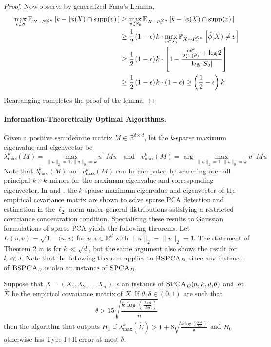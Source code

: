 \begin{proof}
Now observe by generalized Fano's Lemma,
\begin{align*}
\max_{v \in S} \mathbb{E}_{X \sim P_v^{\otimes n}} \left[ k - |\phi(X) \cap \textnormal{supp}(v)| \right] &\ge \max_{v \in S_0} \mathbb{E}_{X \sim P_v^{\otimes n}} \left[ k - |\phi(X) \cap \textnormal{supp}(v)| \right] \\
&\ge \frac{1}{2} \left( 1 - \epsilon \right)k \cdot \max_{v \in S_0} \mathbb{P}_{X \sim P_{v}^{\otimes n}} \left[ \hat{\phi}(X) \neq v \right] \\
&\ge \frac{1}{2} \left( 1 - \epsilon \right)k \cdot \left[ 1 - \frac{\frac{n\theta^2}{2(1 + \theta)} + \log 2}{\log |S_0|} \right] \\
&\ge \frac{1}{2} \left( 1 - \epsilon \right)k \cdot \left(1 - \epsilon \right) \ge \left( \frac{1}{2} - \epsilon \right) k
\end{align*}
Rearranging completes the proof of the lemma.
\end{proof}

\paragraph{Information-Theoretically Optimal Algorithms.} Given a positive semidefinite matrix $M \in \mathbb{R}^{d\times d}$, let the $k$-sparse maximum eigenvalue and eigenvector be
$$\lambda_{\max}^k(M) = \max_{\|u\|_2 = 1, \| u \|_0 = k} u^\top M u \quad \text{and} \quad v_{\max}^k(M) = \arg\max_{\| u \|_2  = 1, \| u \|_0 = k} u^\top M u$$
Note that $\lambda_{\max}^k(M)$ and $v_{\max}^k(M)$ can be computed by searching over all principal $k \times k$ minors for the maximum eigenvalue and corresponding eigenvector. In \cite{berthet2013complexity} and \cite{wang2016statistical}, the $k$-sparse maximum eigenvalue and eigenvector of the empirical covariance matrix are shown to solve sparse PCA detection and estimation in the $\ell_2$ norm under general distributions satisfying a restricted covariance concentration condition. Specializing these results to Gaussian formulations of sparse PCA yields the following theorems. Let $L(u, v) = \sqrt{1 - \langle u, v \rangle}$ for $u, v \in \mathbb{R}^d$ with $\| u \|_2 = \| v \|_2 = 1$. The statement of Theorem 2 in \cite{berthet2013complexity} is for $k \ll \sqrt{d}$, but the same argument also shows the result for $k \ll d$. Note that the following theorem applies to $\textsc{BSPCA}_D$ since any instance of $\textsc{BSPCA}_D$ is also an instance of  $\textsc{SPCA}_D$.

\begin{theorem}
Suppose that $X = (X_1, X_2, \dots, X_n)$ is an instance of $\textsc{SPCA}_D(n, k, d, \theta)$ and let $\hat{\Sigma}$ be the empirical covariance matrix of $X$. If $\theta, \delta \in (0, 1)$ are such that
$$\theta > 15 \sqrt{\frac{k \log \left( \frac{3ed}{k\delta} \right)}{n}}$$
then the algorithm that outputs $H_1$ if $\lambda_{\max}^k(\hat{\Sigma}) > 1 + 8 \sqrt{\frac{k \log \left( \frac{3ed}{k\delta} \right)}{n}}$ and $H_0$ otherwise has Type I$+$II error at most $\delta$.
\end{theorem}

